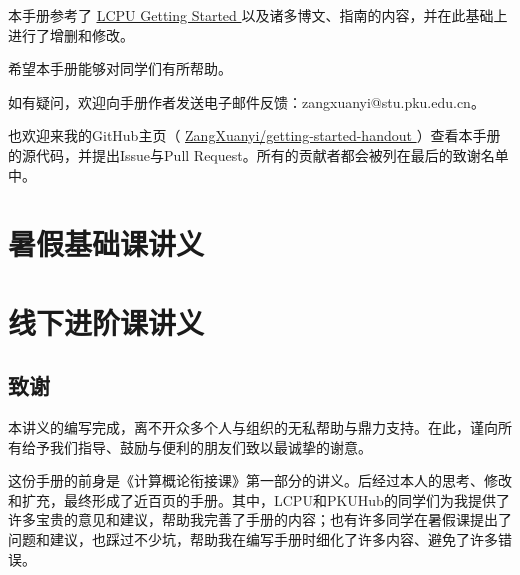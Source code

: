 \documentclass[12pt, openany]{book}
\let\oldhref\href
\renewcommand{\href}[2]{%
  \oldhref{#1}{%
    \color{blue}\underline{#2}%
    \raisebox{0.2ex}{\tiny$\nearrow$}%
  }%
}
\begin{document}
本手册参考了\href{https://missing.lcpu.dev}{LCPU Getting Started}以及诸多博文、指南的内容，并在此基础上进行了增删和修改。

希望本手册能够对同学们有所帮助。

如有疑问，欢迎向手册作者发送电子邮件反馈：zangxuanyi@stu.pku.edu.cn。

也欢迎来我的GitHub主页（\faGithub\href{https://github.com/ZangXuanyi/getting-started-handout}{ZangXuanyi/getting-started-handout}）查看本手册的源代码，并提出Issue与Pull Request。所有的贡献者都会被列在最后的致谢名单中。

\mainmatter

\tableofcontents


\part{暑假基础课讲义}







\part{线下进阶课讲义}











\backmatter



\chapter{致谢}

本讲义的编写完成，离不开众多个人与组织的无私帮助与鼎力支持。在此，谨向所有给予我们指导、鼓励与便利的朋友们致以最诚挚的谢意。

这份手册的前身是《计算概论衔接课》第一部分的讲义。后经过本人的思考、修改和扩充，最终形成了近百页的手册。其中，LCPU和PKUHub的同学们为我提供了许多宝贵的意见和建议，帮助我完善了手册的内容；也有许多同学在暑假课提出了问题和建议，也踩过不少坑，帮助我在编写手册时细化了许多内容、避免了许多错误。
\end{document}
